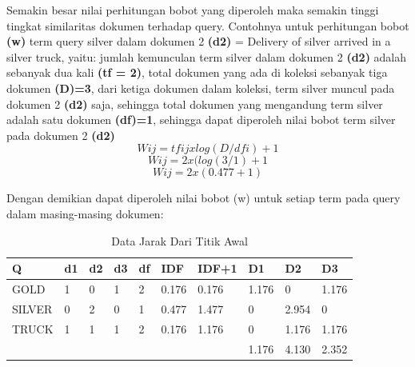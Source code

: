 \par Semakin besar nilai perhitungan bobot yang diperoleh maka semakin tinggi tingkat similaritas dokumen terhadap query. Contohnya untuk perhitungan bobot \textbf{(w)} term query silver dalam dokumen 2 \textbf{(d2)} = Delivery of silver arrived in a silver truck, yaitu: jumlah kemunculan term silver dalam dokumen 2 \textbf{(d2)} adalah sebanyak dua kali \textbf{(tf = 2)}, total dokumen yang ada di koleksi sebanyak tiga dokumen \textbf{(D)=3}, dari ketiga dokumen dalam koleksi, term silver muncul pada dokumen 2 \textbf{(d2)} saja, sehingga total dokumen yang mengandung term silver adalah satu dokumen \textbf{(df)=1}, sehingga dapat diperoleh nilai bobot term silver pada dokumen 2 \textbf{(d2)}
\begin{equation}
    W ij = tfij xlog(D/dfi) + 1
\end{equation}
\begin{equation}
    W ij = 2 x (log(3/1) + 1
\end{equation}
\begin{equation}
    W ij = 2 x (0.477 + 1)
\end{equation}

\par Dengan demikian dapat diperoleh nilai bobot (w) untuk setiap term pada query dalam masing-masing dokumen: 

\begin{table}[]
\centering
\caption{Data Jarak Dari Titik Awal}
\begin{tabular}{|l|l|l|l|l|l|l|l|l|l|}
\hline
Q      & d1 & d2 & d3 & df & IDF   & IDF+1 & D1    & D2    & D3    \\ \hline
GOLD   & 1  & 0  & 1  & 2  & 0.176 & 0.176 & 1.176 & 0     & 1.176 \\ \hline
SILVER & 0  & 2  & 0  & 1  & 0.477 & 1.477 & 0     & 2.954 & 0     \\ \hline
TRUCK  & 1  & 1  & 1  & 2  & 0.176 & 1.176 & 0     & 1.176 & 1.176 \\ \hline
       &    &    &    &    &       &       & 1.176 & 4.130 & 2.352 \\ \hline
\end{tabular}
\end{table}

